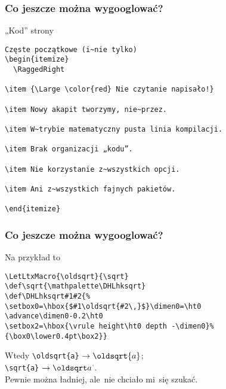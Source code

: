 \documentclass[10pt,t]{beamer}
\def\sqrt{\mathpalette\DHLhksqrt}
\def\DHLhksqrt#1#2{%
\setbox0=\hbox{$#1\oldsqrt{#2\,}$}\dimen0=\ht0
\advance\dimen0-0.2\ht0
\setbox2=\hbox{\vrule height\ht0 depth -\dimen0}%
{\box0\lower0.4pt\box2}}
\begin{document}
\begin{frame}[fragile]
  \frametitle{Co jeszcze można wygooglować?}


  „Kod” strony
\begin{verbatim}
Częste początkowe (i~nie tylko)
\begin{itemize}
  \RaggedRight

\item {\Large \color{red} Nie czytanie napisało!}

\item Nowy akapit tworzymy, nie~przez.

\item W~trybie matematyczny pusta linia kompilacji.

\item Brak organizacji „kodu”.

\item Nie korzystanie z~wszystkich opcji.

\item Ani z~wszystkich fajnych pakietów.

\end{itemize}
\end{verbatim}

\end{frame}





\begin{frame}[fragile]
  \frametitle{Co jeszcze można wygooglować?}


  Na przykład to
\begin{verbatim}
\LetLtxMacro{\oldsqrt}{\sqrt}
\def\sqrt{\mathpalette\DHLhksqrt}
\def\DHLhksqrt#1#2{%
\setbox0=\hbox{$#1\oldsqrt{#2\,}$}\dimen0=\ht0
\advance\dimen0-0.2\ht0
\setbox2=\hbox{\vrule height\ht0 depth -\dimen0}%
{\box0\lower0.4pt\box2}}
\end{verbatim}

  Wtedy {\Large \verb+\oldsqrt{a}+ $\to \oldsqrt{a}$; \\
    \verb+\sqrt{a}+ $\to \sqrt{a}$.} \\
  Pewnie można ładniej, ale~nie chciało mi~się szukać.

\end{frame}
\end{document}
